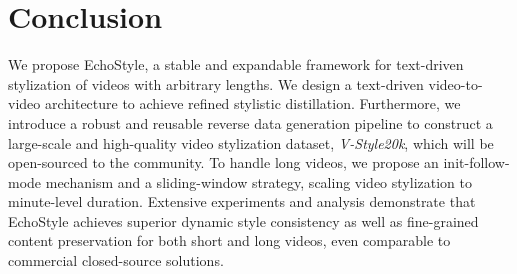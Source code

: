 \documentclass[runningheads]{llncs}
\begin{document}
\section{Conclusion}
We propose EchoStyle, a stable and expandable framework for text-driven stylization of videos with arbitrary lengths. We design a text-driven video-to-video architecture to achieve refined stylistic distillation. Furthermore, we introduce a robust and reusable reverse data generation pipeline to construct a large-scale and high-quality video stylization dataset, \textit{V-Style20k}, which will be open-sourced to the community. To handle long videos, we propose an init-follow-mode mechanism and a sliding-window strategy, scaling video stylization to minute-level duration. Extensive experiments and analysis demonstrate that EchoStyle achieves superior dynamic style consistency as well as fine-grained content preservation for both short and long videos, even comparable to commercial closed-source solutions.



%
%


\end{document}
